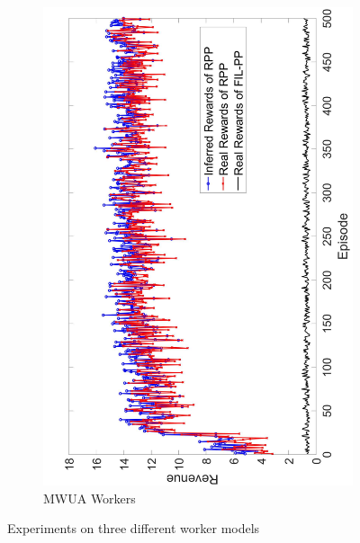 \documentclass[letterpaper]{article} %
\begin{document}
\begin{figure}[htb]
\begin{subfigure}[t]{0.3\textwidth}
        \includegraphics[width=\textwidth]{image/3}
        \caption{\label{E3}  MWUA Workers}
    \end{subfigure}    
    \caption{\label{ED}Experiments on three different worker models}
\end{figure}
\end{document}
